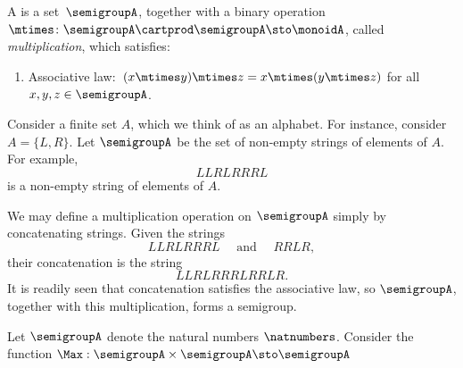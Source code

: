 
\section{}\label{sec:semigroups}


\begin{definition}[Semigroup]
  \label{def:semigroup}
  A \emph{} is a set~$\semigroupA$, together with a binary operation~$\mtimes \colon \semigroupA \cartprod \semigroupA \sto \monoidA$, called \emph{multiplication}, which satisfies:
  \begin{enumerate}
    \item Associative law:~$(x\mtimes y)\mtimes z=x\mtimes (y\mtimes z)$ for all $x , y, z \in \semigroupA$. 
  \end{enumerate}
\end{definition}

\begin{example}\label{string-semigroup}
Consider a finite set $A$, which we think of as an alphabet. For instance, consider $A = \{ L, R \}$. 
Let $\semigroupA$ be the set of non-empty strings of elements of $A$. For example, 
$$ LLRLRRRL $$ 
is a non-empty string of elements of $A$. 

We may define a multiplication operation on $\semigroupA$ simply by concatenating strings. Given the strings
$$ LLRLRRRL  \quad \text{ and } \quad RRLR, $$ 
their concatenation is the string
$$ LLRLRRRLRRLR.$$
It is readily seen that concatenation satisfies the associative law, so $\semigroupA$, together with this multiplication, forms a semigroup. 
\end{example}


\begin{example}\label{string-semigroup}
Let $\semigroupA$ denote the natural numbers $\natnumbers$. Consider the function $\Max : \semigroupA \times \semigroupA \sto \semigroupA$
\end{example}